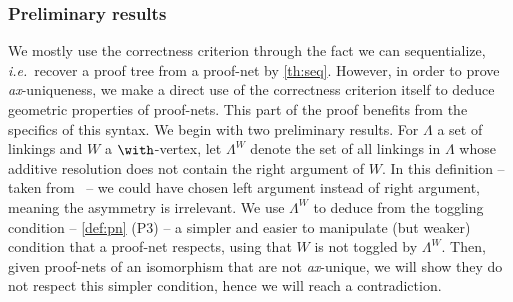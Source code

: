 \documentclass{lmcs}
\newcommand*{\ie}{\emph{i.e.}}
\newcommand*{\unique}{\textit{ax}-unique}
\begin{document}
\subsubsection{Preliminary results}
\label{subsubsec:4.32+}

We mostly use the correctness criterion through the fact we can sequentialize, \ie\ recover a proof tree from a proof-net by \autoref{th:seq}.
However, in order to prove \unique ness, we make a direct use of the correctness criterion itself to deduce geometric properties of proof-nets.
This part of the proof benefits from the specifics of this syntax.
We begin with two preliminary results.
For $\Lambda$ a set of linkings and $W$ a $\with$-vertex, let $\Lambda^W$ denote the set of all linkings in $\Lambda$ whose additive resolution does not contain the right argument of $W$.
In this definition -- taken from~\cite{mallpnlong} -- we could have chosen left argument instead of right argument, meaning the asymmetry is irrelevant.
We use $\Lambda^W$ to deduce from the toggling condition -- \autoref{def:pn} (P3) -- a simpler and easier to manipulate (but weaker) condition that a proof-net respects, using that $W$ is not toggled by $\Lambda^W$.
Then, given proof-nets of an isomorphism that are not \unique, we will show they do not respect this simpler condition, hence we will reach a contradiction.
\end{document}
